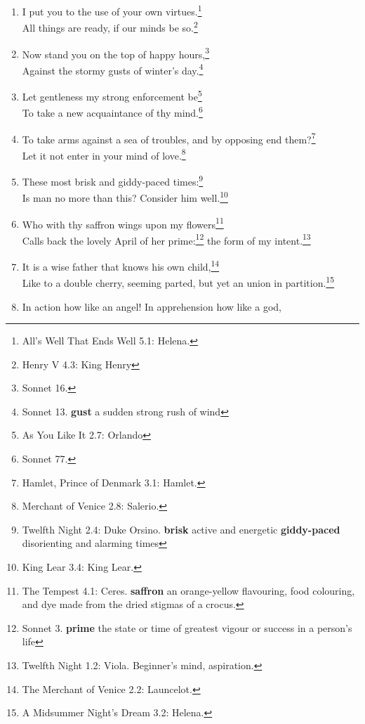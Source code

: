 \documentclass[17pt,twoside]{extarticle}
\begin{document}
\begin{enumerate}
  I must go seek some dewdrops here;\footnote{A Midsummer Night's Dream
    2.1: Fairy.}\\It blesseth him that gives and him that
  takes.\footnote{The Merchant of Venice 4.1: Portia. On mercy
    (compassion).}
\item
  I put you to the use of your own virtues.\footnote{All's Well That
    Ends Well 5.1: Helena.}\\All things are ready, if our minds be
  so.\footnote{Henry V 4.3: King Henry}
\item
  Now stand you on the top of happy hours,\footnote{Sonnet 16.}\\Against
  the stormy gusts of winter's day.\footnote{Sonnet 13. \textbf{gust} a
    sudden strong rush of wind}
\item
  Let gentleness my strong enforcement be\footnote{As You Like It 2.7:
    Orlando}\\To take a new acquaintance of thy mind.\footnote{Sonnet
    77.}
\item
  To take arms against a sea of troubles, and by opposing end
  them?\footnote{Hamlet, Prince of Denmark 3.1: Hamlet.}\\Let it not
  enter in your mind of love.\footnote{Merchant of Venice 2.8: Salerio.}
\item
  These most brisk and giddy-paced times:\footnote{Twelfth Night 2.4:
    Duke Orsino. \textbf{brisk} active and energetic
    \textbf{giddy-paced} disorienting and alarming times}\\Is man no
  more than this? Consider him well.\footnote{King Lear 3.4: King Lear.}
\item
  Who with thy saffron wings upon my flowers\footnote{The Tempest 4.1:
    Ceres. \textbf{saffron} an orange-yellow flavouring, food colouring,
    and dye made from the dried stigmas of a crocus.}\\Calls back the
  lovely April of her prime:\footnote{Sonnet 3. \textbf{prime} the state
    or time of greatest vigour or success in a person's life} the form
  of my intent.\footnote{Twelfth Night 1.2: Viola. Beginner's mind,
    aspiration.}
\item
  It is a wise father that knows his own child,\footnote{The Merchant of
    Venice 2.2: Launcelot.}\\Like to a double cherry, seeming parted,
  but yet an union in partition.\footnote{A Midsummer Night's Dream 3.2:
    Helena.}
\item
  In action how like an angel! In apprehension how like a god,

\end{enumerate}
\end{document}
